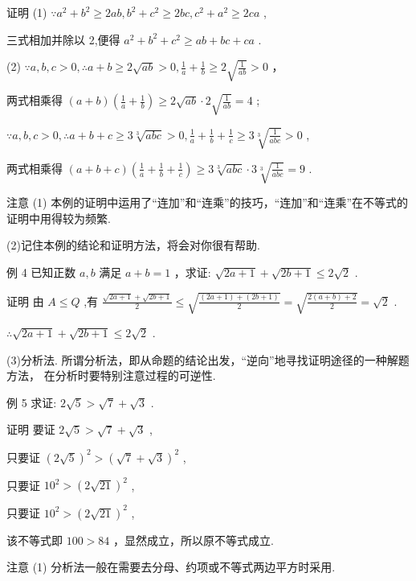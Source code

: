 \documentclass[10pt]{article}
\newcommand*\circled[1]{\tikz[baseline=(char.base)]{\node[shape=circle,draw,inner sep=1.5pt] (char) {\small #1};}}
\begin{document}
证明 (1) \(\because {a}^{2} + {b}^{2} \geq  {2ab},{b}^{2} + {c}^{2} \geq  {2bc},{c}^{2} + {a}^{2} \geq  {2ca}\) ,

三式相加并除以 2,便得 \({a}^{2} + {b}^{2} + {c}^{2} \geq  {ab} + {bc} + {ca}\) .

(2) \circled{1}  \(\because a,b,c > 0,\therefore a + b \geq  2\sqrt{ab} > 0,\frac{1}{a} + \frac{1}{b} \geq  2\sqrt{\frac{1}{ab}} > 0\) ，

两式相乘得 \(\left( {a + b}\right) \left( {\frac{1}{a} + \frac{1}{b}}\right)  \geq  2\sqrt{ab} \cdot  2\sqrt{\frac{1}{ab}} = 4\) ;

 \circled{2}  \(\because a,b,c > 0,\therefore a + b + c \geq  3\sqrt[3]{abc} > 0,\frac{1}{a} + \frac{1}{b} + \frac{1}{c} \geq  3\sqrt[3]{\frac{1}{abc}} > 0\) ,

两式相乘得 \(\left( {a + b + c}\right) \left( {\frac{1}{a} + \frac{1}{b} + \frac{1}{c}}\right)  \geq  3\sqrt[3]{abc} \cdot  3\sqrt[3]{\frac{1}{abc}} = 9\) .

注意 (1) 本例的证明中运用了“连加”和“连乘”的技巧，“连加”和“连乘”在不等式的证明中用得较为频繁.

(2)记住本例的结论和证明方法，将会对你很有帮助.

例 4 已知正数 \(a,b\) 满足 \(a + b = 1\) ，求证: \(\sqrt{{2a} + 1} + \sqrt{{2b} + 1} \leq  2\sqrt{2}\) .

证明 由 \(A \leq  Q\) ,有 \(\frac{\sqrt{{2a} + 1} + \sqrt{{2b} + 1}}{2} \leq  \sqrt{\frac{\left( {{2a} + 1}\right)  + \left( {{2b} + 1}\right) }{2}} = \sqrt{\frac{2\left( {a + b}\right)  + 2}{2}} = \sqrt{2}\) .

\(\therefore \sqrt{{2a} + 1} + \sqrt{{2b} + 1} \leq  2\sqrt{2}\) .

(3)分析法. 所谓分析法，即从命题的结论出发，“逆向”地寻找证明途径的一种解题方法， 在分析时要特别注意过程的可逆性.

例 5 求证: \(2\sqrt{5} > \sqrt{7} + \sqrt{3}\) .

证明 要证 \(2\sqrt{5} > \sqrt{7} + \sqrt{3}\) ,

只要证 \({\left( 2\sqrt{5}\right) }^{2} > {\left( \sqrt{7} + \sqrt{3}\right) }^{2}\) ,

只要证 \({10}^{2} > {\left( 2\sqrt{21}\right) }^{2}\) ,

只要证 \({10}^{2} > {\left( 2\sqrt{21}\right) }^{2}\) ,

该不等式即 \({100} > {84}\) ，显然成立，所以原不等式成立.

注意 (1) 分析法一般在需要去分母、约项或不等式两边平方时采用.
\end{document}
